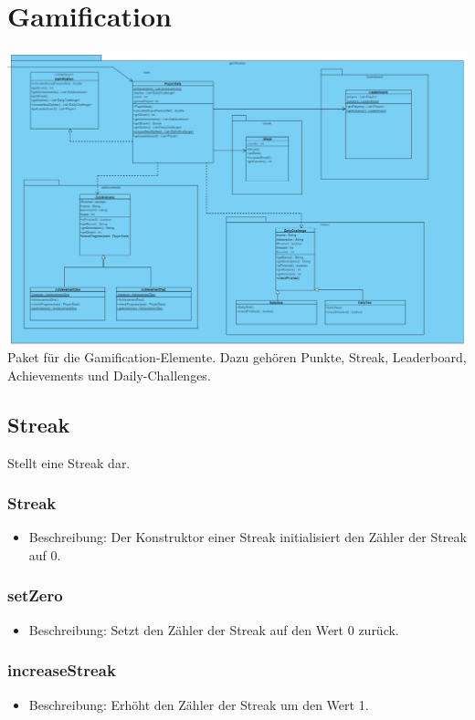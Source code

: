 \documentclass[a4paper]{scrreprt}
\begin{document}
    
   \section{Gamification}
    \includegraphics[width=\textwidth]{img/Gamification.PNG}
   Paket für die Gamification-Elemente. Dazu gehören Punkte, Streak, Leaderboard, Achievements und Daily-Challenges.
   
   
   \subsection{Streak}
   Stellt eine Streak dar.
   
   \subsubsection{Streak}
   \begin{itemize}
   	  \item Beschreibung: Der Konstruktor einer Streak initialisiert den Zähler der Streak auf 0.
   \end{itemize}
   \subsubsection{setZero}
   \begin{itemize}
   	\item Beschreibung: Setzt den Zähler der Streak auf den Wert 0 zurück.
   \end{itemize}
   \subsubsection{increaseStreak}
   \begin{itemize}
   	\item Beschreibung: Erhöht den Zähler der Streak um den Wert 1.
   \end{itemize}
\end{document}
